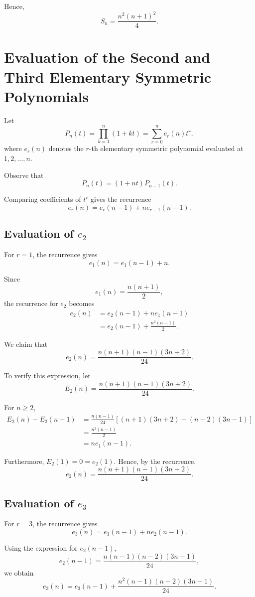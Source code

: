 \documentclass[11pt,a4paper]{article}
\begin{document}
Hence,
\[
\boxed{
S_n=\frac{n^2(n+1)^2}{4}
}.
\]

\section{Evaluation of the Second and Third Elementary Symmetric Polynomials}
\label{appendix:symmetric-polynomials}

Let
\[
P_n(t)=\prod_{k=1}^{n}(1+kt)
=\sum_{r=0}^{n}e_r(n)t^r,
\]
where $e_r(n)$ denotes the $r$-th elementary symmetric
polynomial evaluated at $1,2,\ldots,n$.

Observe that
\[
P_n(t)=(1+nt)P_{n-1}(t).
\]

Comparing coefficients of $t^r$ gives the recurrence
\[
e_r(n)=e_r(n-1)+ne_{r-1}(n-1).
\]

\subsection*{Evaluation of $e_2$}

For $r=1$, the recurrence gives
\[
e_1(n)=e_1(n-1)+n.
\]

Since
\[
e_1(n)=\frac{n(n+1)}{2},
\]
the recurrence for $e_2$ becomes
\[
\begin{aligned}
e_2(n)
&=e_2(n-1)+ne_1(n-1)\\
&=e_2(n-1)+\frac{n^2(n-1)}{2}.
\end{aligned}
\]

We claim that
\[
e_2(n)=
\frac{n(n+1)(n-1)(3n+2)}{24}.
\]

To verify this expression, let
\[
E_2(n)=\frac{n(n+1)(n-1)(3n+2)}{24}.
\]

For $n\geq 2$,
\[
\begin{aligned}
E_2(n)-E_2(n-1)
&=\frac{n(n-1)}{24}
\left[
(n+1)(3n+2)-(n-2)(3n-1)
\right]\\
&=\frac{n^2(n-1)}{2}\\
&=ne_1(n-1).
\end{aligned}
\]

Furthermore, $E_2(1)=0=e_2(1)$. Hence, by the recurrence,
\[
\boxed{
e_2(n)=
\frac{n(n+1)(n-1)(3n+2)}{24}
}.
\]

\subsection*{Evaluation of $e_3$}

For $r=3$, the recurrence gives
\[
e_3(n)=e_3(n-1)+ne_2(n-1).
\]

Using the expression for $e_2(n-1)$,
\[
e_2(n-1)
=
\frac{n(n-1)(n-2)(3n-1)}{24},
\]
we obtain
\[
e_3(n)=e_3(n-1)
+\frac{n^2(n-1)(n-2)(3n-1)}{24}.
\]
\end{document}
